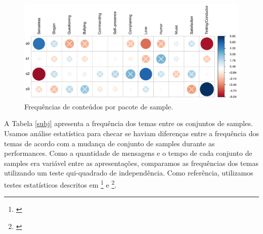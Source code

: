 

\begin{figure}

\includegraphics[width=1.1\linewidth]{pictures/cap3/p_values}
\caption{Frequências de conteúdos por pacote de sample.}
\label{subj_themes}
\end{figure}

A Tabela \ref{subj} apresenta a frequência dos temas entre os conjuntos de samples. Usamos análise estatística para checar se haviam diferenças entre a frequência dos temas de acordo com a mudança de conjunto de samples durante as performances. Como a quantidade de mensagens e o tempo de cada conjunto de samples era variável entre as apresentações, comparamos as frequências dos temas utilizando um teste qui-quadrado de independência. Como referência, utilizamos testes estatísticos descritos em \footnote{\cite{beasley1995multiple}} e \footnote{\cite{garcia2003cellwise}}. 


